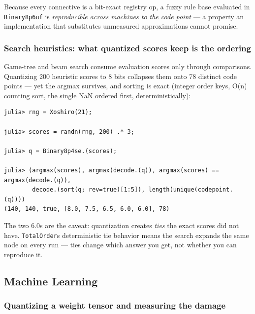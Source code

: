 Because every connective is a bit-exact registry op, a fuzzy rule base evaluated in \texttt{Binary8p6uf} is \emph{reproducible across machines to the code point} — a property an implementation that substitutes unmeasured approximations cannot promise.



\subsubsection{Search heuristics: what quantized scores keep is the ordering}



\label{18015521726916863751}{}


Game-tree and beam search consume evaluation scores only through comparisons. Quantizing 200 heuristic scores to 8 bits collapses them onto 78 distinct code points — yet the argmax survives, and sorting is exact (integer order keys, O(n) counting sort, the single NaN ordered first, deterministically):




\nopagebreak[4]
\begin{verbatim}
julia> rng = Xoshiro(21);

julia> scores = randn(rng, 200) .* 3;

julia> q = Binary8p4se.(scores);

julia> (argmax(scores), argmax(decode.(q)), argmax(scores) == argmax(decode.(q)),
        decode.(sort(q; rev=true)[1:5]), length(unique(codepoint.(q))))
(140, 140, true, [8.0, 7.5, 6.5, 6.0, 6.0], 78)
\end{verbatim}



The two 6.0s are the caveat: quantization creates \emph{ties} the exact scores did not have. \texttt{TotalOrder}{\textquotesingle}s deterministic tie behavior means the search expands the same node on every run — ties change which answer you get, not whether you can reproduce it.



\subsection{Machine Learning}



\label{11381515430689351323-dup1}{}


\subsubsection{Quantizing a weight tensor and measuring the damage}



